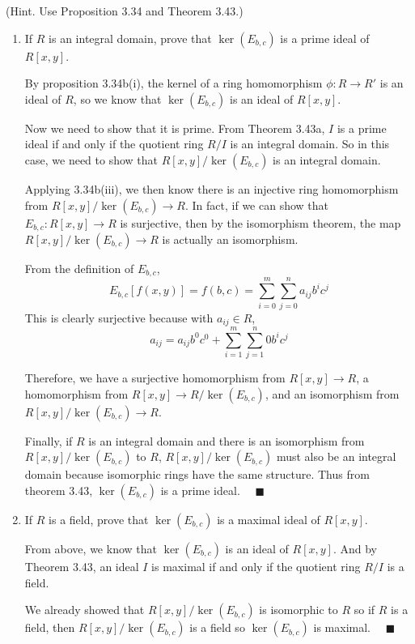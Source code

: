 \documentclass[12pt]{article}
\newcommand{\qed}{\quad \blacksquare}
\begin{document}
    (Hint. Use Proposition 3.34 and Theorem 3.43.)
    \begin{enumerate}[label=(\alph*)]
        \item If $R$ is an integral domain, prove that $\ker(E_{b,c})$ is a prime ideal of $R[x, y]$.
        
            \color{blue}
                By proposition 3.34b(i), the kernel of a ring homomorphism $\phi: R \to R'$ is an ideal of $R$, so we know that $\ker(E_{b, c})$ is an ideal of $R[x, y]$. 

                Now we need to show that it is prime. From Theorem 3.43a, $I$ is a prime ideal if and only if the quotient ring $R/I$ is an integral domain. So in this case, we need to show that $R[x,y]/\ker(E_{b, c})$ is an integral domain. 

                Applying 3.34b(iii), we then know there is an injective ring homomorphism from $R[x,y]/\ker(E_{b, c}) \to R$. In fact, if we can show that $E_{b,c} : R[x,y] \to R$ is surjective, then by the isomorphism theorem, the map $R[x,y]/\ker(E_{b, c}) \to R$ is actually an isomorphism. 

                From the definition of $E_{b,c}$,
                \[E_{b,c}[f(x, y)] = f(b, c) = \sum_{i=0}^m \sum_{j=0}^n a_{ij}b^ic^j\]
                This is clearly surjective because with $a_{ij} \in R$, 
                \[a_{ij} = a_{ij}b^0c^0 + \sum_{i=1}^m \sum_{j=1}^n 0b^ic^j\]
                
                Therefore, we have a surjective homomorphism from $R[x, y] \to R$, a homomorphism from $R[x, y] \to R/\ker(E_{b,c})$, and an isomorphism from $R[x,y]/\ker(E_{b, c}) \to R$.

                Finally, if $R$ is an integral domain and there is an isomorphism from $R[x, y]/\ker(E_{b,c})$ to $R$, $R[x, y]/\ker(E_{b,c})$ must also be an integral domain because isomorphic rings have the same structure. Thus from theorem 3.43, $\ker(E_{b,c})$ is a prime ideal. $\qed$
            \color{black}
        \pagebreak
        \item If $R$ is a field, prove that $\ker(E_{b,c})$ is a maximal ideal of $R[x, y]$.
        
            \color{blue}
                From above, we know that $\ker(E_{b,c})$ is an ideal of $R[x, y]$. And by Theorem 3.43, an ideal $I$ is maximal if and only if the quotient ring $R/I$ is a field. 

                We already showed that $R[x,y]/\ker(E_{b, c})$ is isomorphic to $R$ so if $R$ is a field, then $R[x,y]/\ker(E_{b, c})$ is a field so $\ker(E_{b, c})$ is maximal. $\qed$ 
            \color{black}

    \end{enumerate}
\end{document}
